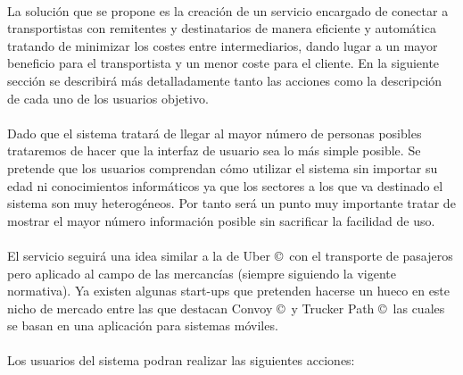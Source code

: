 \documentclass[10pt, a4paper,spanish]{article}
\begin{document}
		\paragraph{}
		La solución que se propone es la creación de un servicio encargado de conectar a transportistas con remitentes y destinatarios de manera eficiente y automática tratando de minimizar los costes entre intermediarios, dando lugar a un mayor beneficio para el transportista y un menor coste para el cliente. En la siguiente sección se describirá más detalladamente tanto las acciones como la descripción de cada uno de los usuarios objetivo.

		\paragraph{}
		Dado que el sistema tratará de llegar al mayor número de personas posibles trataremos de hacer que la interfaz de usuario sea lo más simple posible.
		Se pretende que los usuarios comprendan cómo utilizar el sistema sin importar su edad ni conocimientos informáticos ya que los sectores a los que va destinado el sistema son muy heterogéneos. Por tanto será un punto muy importante tratar de mostrar el mayor número información posible sin sacrificar la facilidad de uso.

		\paragraph{}
		El servicio seguirá una idea similar a la de Uber \copyright\  con el transporte de pasajeros pero aplicado al campo de las mercancías (siempre siguiendo la vigente normativa). Ya existen algunas start-ups que pretenden hacerse un hueco en este nicho de mercado entre las que destacan Convoy \copyright\ y Trucker Path \copyright\ las cuales se basan en una aplicación para sistemas móviles. \cite{expansion_uber_transporte}

		\paragraph{}
		Los usuarios del sistema podran realizar las siguientes acciones:
\end{document}
